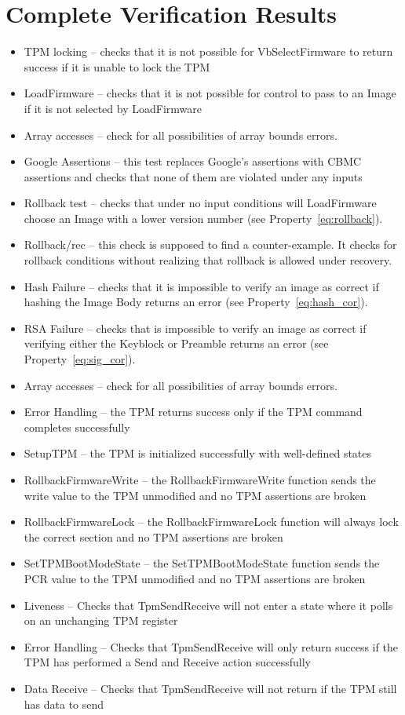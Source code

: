 \section{Complete Verification Results}
\begin{itemize}
 \item  TPM locking -- checks that it is not possible for VbSelectFirmware to return success if it is unable to lock the TPM
 \item  LoadFirmware -- checks that it is not possible for control to pass to an Image if it is not selected by LoadFirmware
 \item  Array accesses -- check for all possibilities of array bounds errors.
 \item  Google Assertions -- this test replaces Google's assertions with CBMC assertions and checks that none of them are violated under any inputs
 \item  Rollback test -- checks that under no input conditions will LoadFirmware choose an Image with a lower version number (see Property~\ref{eq:rollback}).
 \item  Rollback/rec  -- this check is supposed to find a counter-example. It checks for rollback conditions without realizing that rollback is allowed under recovery. 
 \item  Hash Failure -- checks that it is impossible to verify an image as correct if hashing the Image Body returns an error (see Property~\ref{eq:hash_cor}).
 \item  RSA Failure -- checks that is impossible to verify an image as correct if verifying either the Keyblock or Preamble returns an error (see Property~\ref{eq:sig_cor}).
 \item  Array accesses -- check for all possibilities of array bounds errors.
   \item Error Handling --  the TPM returns success only if the TPM command completes successfully
    \item SetupTPM -- the TPM is initialized successfully with well-defined states
    \item  RollbackFirmwareWrite -- the RollbackFirmwareWrite function sends the write value to the TPM unmodified and no TPM assertions are broken
    \item  RollbackFirmwareLock -- the RollbackFirmwareLock function will always lock the correct section and no TPM assertions are broken
    \item SetTPMBootModeState -- the SetTPMBootModeState function sends the PCR value to the TPM unmodified and no TPM assertions are broken
   \item Liveness -- Checks that TpmSendReceive will not enter a state where it polls on an unchanging TPM register
   \item Error Handling -- Checks that TpmSendReceive will only return success if the TPM has performed a Send and Receive action successfully
   \item Data Receive -- Checks that TpmSendReceive will not return if the TPM still has data to send 
\end{itemize}

